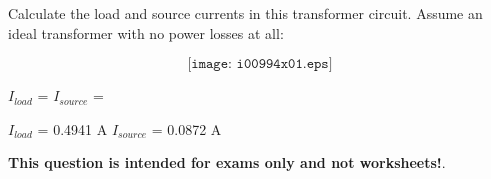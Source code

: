 

Calculate the load and source currents in this transformer circuit.  Assume an ideal transformer with no power losses at all:

$$\texttt{[image: i00994x01.eps]}$$

$I_{load}$ = \hskip 80pt $I_{source}$ = 

\vskip 10pt







$I_{load}$ = 0.4941 A \hskip 80pt $I_{source}$ = 0.0872 A







{\bf This question is intended for exams only and not worksheets!}.



